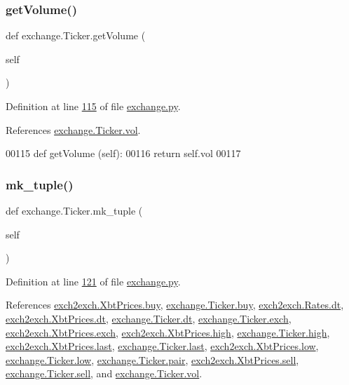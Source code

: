 \subsubsection{\texorpdfstring{get\+Volume()}{getVolume()}}
{\footnotesize\ttfamily def exchange.\+Ticker.\+get\+Volume (\begin{DoxyParamCaption}\item[{}]{self }\end{DoxyParamCaption})}



Definition at line \hyperlink{exchange_8py_source_l00115}{115} of file \hyperlink{exchange_8py_source}{exchange.\+py}.



References \hyperlink{exchange_8py_source_l00065}{exchange.\+Ticker.\+vol}.


\begin{DoxyCode}
00115     \textcolor{keyword}{def }getVolume (self):
00116         \textcolor{keywordflow}{return} self.vol
00117     
\end{DoxyCode}
\mbox{\label{classexchange_1_1_ticker_aba1398da3113a7ff17b2496ce92c7238}} 
\subsubsection{\texorpdfstring{mk\+\_\+tuple()}{mk\_tuple()}}
{\footnotesize\ttfamily def exchange.\+Ticker.\+mk\+\_\+tuple (\begin{DoxyParamCaption}\item[{}]{self }\end{DoxyParamCaption})}



Definition at line \hyperlink{exchange_8py_source_l00121}{121} of file \hyperlink{exchange_8py_source}{exchange.\+py}.



References \hyperlink{exch2exch_8py_source_l00059}{exch2exch.\+Xbt\+Prices.\+buy}, \hyperlink{exchange_8py_source_l00060}{exchange.\+Ticker.\+buy}, \hyperlink{exch2exch_8py_source_l00028}{exch2exch.\+Rates.\+dt}, \hyperlink{exch2exch_8py_source_l00057}{exch2exch.\+Xbt\+Prices.\+dt}, \hyperlink{exchange_8py_source_l00059}{exchange.\+Ticker.\+dt}, \hyperlink{exchange_8py_source_l00057}{exchange.\+Ticker.\+exch}, \hyperlink{exch2exch_8py_source_l00064}{exch2exch.\+Xbt\+Prices.\+exch}, \hyperlink{exch2exch_8py_source_l00061}{exch2exch.\+Xbt\+Prices.\+high}, \hyperlink{exchange_8py_source_l00062}{exchange.\+Ticker.\+high}, \hyperlink{exch2exch_8py_source_l00063}{exch2exch.\+Xbt\+Prices.\+last}, \hyperlink{exchange_8py_source_l00064}{exchange.\+Ticker.\+last}, \hyperlink{exch2exch_8py_source_l00062}{exch2exch.\+Xbt\+Prices.\+low}, \hyperlink{exchange_8py_source_l00063}{exchange.\+Ticker.\+low}, \hyperlink{exchange_8py_source_l00058}{exchange.\+Ticker.\+pair}, \hyperlink{exch2exch_8py_source_l00058}{exch2exch.\+Xbt\+Prices.\+sell}, \hyperlink{exchange_8py_source_l00061}{exchange.\+Ticker.\+sell}, and \hyperlink{exchange_8py_source_l00065}{exchange.\+Ticker.\+vol}.



